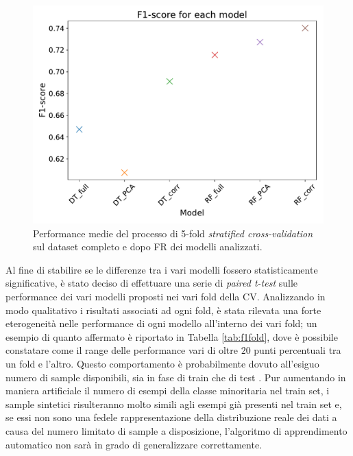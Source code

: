\begin{figure}
	\centering
	\includegraphics[width=1\linewidth]{images/fscore}
	\caption{Performance medie del processo di 5-fold \textit{stratified cross-validation} sul dataset completo e dopo FR dei modelli analizzati.}
	\label{fig:fscore}
\end{figure}
Al fine di stabilire se le differenze tra i vari modelli fossero statisticamente significative, è stato deciso di effettuare una serie di \textit{paired t-test} sulle performance dei vari modelli proposti nei vari fold della CV.
Analizzando in modo qualitativo i risultati associati ad ogni fold, è stata rilevata una forte eterogeneità nelle performance di ogni modello all'interno dei vari fold; un esempio di quanto affermato è riportato in Tabella \ref{tab:f1fold}, dove è possibile constatare come il range delle performance vari di oltre $20$ punti percentuali tra un fold e l'altro. Questo comportamento è probabilmente dovuto all'esiguo numero di sample disponibili, sia in fase di train che di test . Pur aumentando in maniera artificiale il numero di esempi della classe minoritaria nel train set, i sample sintetici risulteranno molto simili agli esempi già presenti nel train set e, se essi non sono una fedele rappresentazione della distribuzione reale dei dati a causa del numero limitato di sample  a disposizione, l'algoritmo di apprendimento automatico non sarà in grado di generalizzare correttamente. 
